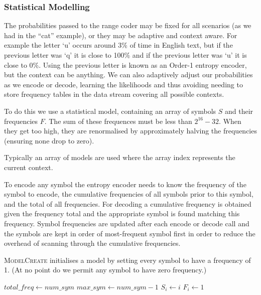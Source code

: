 \documentclass[a4paper]{article}
\begin{document}
\begin{algorithmic}[1]
   
    \State {}
  \EndFor
\EndProcedure
\end{algorithmic}


\subsubsection*{Statistical Modelling}

The probabilities passed to the range coder may be fixed for all scenarios (as we had in the ``cat'' example), or they may be adaptive and context aware.
For example the letter `u' occurs around 3\% of time in English text, but if the previous letter was `q' it is close to 100\% and if the previous letter was `u' it is close to 0\%.
Using the previous letter is known as an Order-1 entropy encoder, but the context can be anything.
We can also adaptively adjust our probabilities as we encode or
decode, learning the likelihoods and thus avoiding needing to store
frequency tables in the data stream covering all possible contexts.

To do this we use a statistical model, containing an array of symbols $S$ and their frequencies $F$.
The sum of these frequences must be less than $2^{16}-32$.
When they get too high, they are renormalised by approximately halving the frequencies (ensuring none drop to zero).

Typically an array of models are used where the array index represents the current context.

To encode any symbol the entropy encoder needs to know the frequency of the symbol to encode, the cumulative frequencies of all symbols prior to this symbol, and the total of all frequencies.
For decoding a cumulative frequency is obtained given the frequency total and the appropriate symbol is found matching this frequency.
Symbol frequencies are updated after each encode or decode call and the symbols are kept in order of most-frequent symbol first in order to  reduce the overhead of scanning through the cumulative frequencies.

\textsc{ModelCreate} initialises a model by setting every symbol to have a frequency of 1.
(At no point do we permit any symbol to have zero frequency.)

\begin{algorithmic}[1]
  \State $total\_freq \gets num\_sym$
  \State $max\_sym \gets num\_sym-1$
    \State $S_i \gets i$
    \State $F_i \gets 1$
  \EndFor
\EndProcedure
\end{algorithmic}
\end{document}
